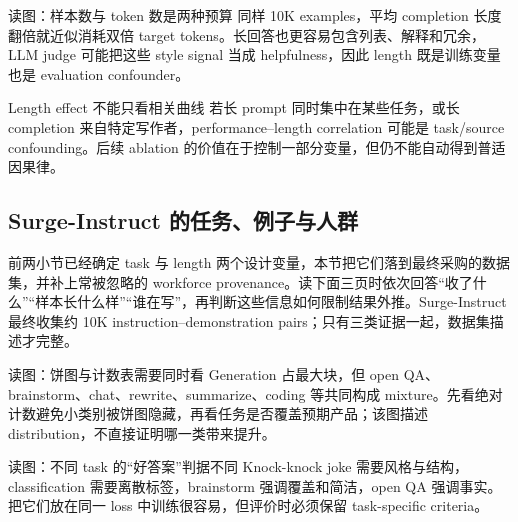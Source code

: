 
\begin{knowledgebox}{读图：样本数与 token 数是两种预算}
同样 10K examples，平均 completion 长度翻倍就近似消耗双倍 target tokens。长回答也更容易包含列表、解释和冗余，LLM judge 可能把这些 style signal 当成 helpfulness，因此 length 既是训练变量也是 evaluation confounder。
\end{knowledgebox}


\begin{warningbox}{Length effect 不能只看相关曲线}
若长 prompt 同时集中在某些任务，或长 completion 来自特定写作者，performance--length correlation 可能是 task/source confounding。后续 ablation 的价值在于控制一部分变量，但仍不能自动得到普适因果律。
\end{warningbox}

\subsection{Surge-Instruct 的任务、例子与人群}

前两小节已经确定 task 与 length 两个设计变量，本节把它们落到最终采购的数据集，并补上常被忽略的 workforce provenance。读下面三页时依次回答“收了什么”“样本长什么样”“谁在写”，再判断这些信息如何限制结果外推。Surge-Instruct 最终收集约 10K instruction--demonstration pairs；只有三类证据一起，数据集描述才完整。


\begin{knowledgebox}{读图：饼图与计数表需要同时看}
Generation 占最大块，但 open QA、brainstorm、chat、rewrite、summarize、coding 等共同构成 mixture。先看绝对计数避免小类别被饼图隐藏，再看任务是否覆盖预期产品；该图描述 distribution，不直接证明哪一类带来提升。
\end{knowledgebox}


\begin{knowledgebox}{读图：不同 task 的“好答案”判据不同}
Knock-knock joke 需要风格与结构，classification 需要离散标签，brainstorm 强调覆盖和简洁，open QA 强调事实。把它们放在同一 loss 中训练很容易，但评价时必须保留 task-specific criteria。
\end{knowledgebox}

